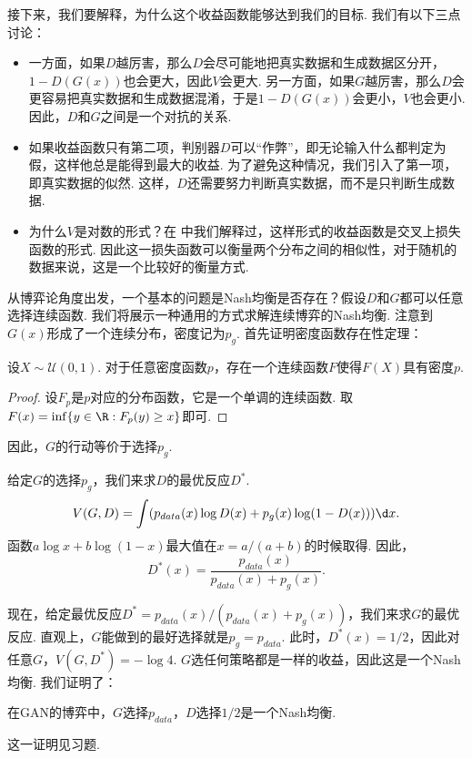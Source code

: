 接下来，我们要解释，为什么这个收益函数能够达到我们的目标. 我们有以下三点讨论：

\begin{itemize}
    \item 一方面，如果$D$越厉害，那么$D$会尽可能地把真实数据和生成数据区分开，$1-D(G(x))$也会更大，因此$V$会更大. 另一方面，如果$G$越厉害，那么$D$会更容易把真实数据和生成数据混淆，于是$1-D(G(x))$会更小，$V$也会更小. 因此，$D$和$G$之间是一个对抗的关系.
    
    \item 如果收益函数只有第二项，判别器$D$可以“作弊”，即无论输入什么都判定为假，这样他总是能得到最大的收益. 为了避免这种情况，我们引入了第一项，即真实数据的似然. 这样，$D$还需要努力判断真实数据，而不是只判断生成数据.
    
    \item 为什么$V$是对数的形式？在 中我们解释过，这样形式的收益函数是交叉上损失函数的形式. 因此这一损失函数可以衡量两个分布之间的相似性，对于随机的数据来说，这是一个比较好的衡量方式.
\end{itemize}


从博弈论角度出发，一个基本的问题是Nash均衡是否存在？假设$D$和$G$都可以任意选择连续函数. 我们将展示一种通用的方式求解连续博弈的Nash均衡. 注意到$G(x)$形成了一个连续分布，密度记为$p_g$.  首先证明密度函数存在性定理：
\begin{theorem}
设$X\sim \mathcal U(0,1)$. 对于任意密度函数$p$，存在一个连续函数$F$使得$F(X)$具有密度$p$.
\end{theorem}
\begin{proof}
设$F_p$是$p$对应的分布函数，它是一个单调的连续函数. 取$F(x)=\inf\{y\in \R: F_p(y)\geq x\}$即可.
\end{proof}
因此，$G$的行动等价于选择$p_g$.

给定$G$的选择$p_g$，我们来求$D$的最优反应$D^*$.
    \[V(G,D)=\int (p_{data}(x)\log D(x)+p_g(x)\log(1-D(x)))\d x.\]
函数$a\log x+b\log(1-x)$最大值在$x=a/(a+b)$的时候取得. 因此，
    \[D^*(x)=\frac{p_{data}(x)}{p_{data}(x)+p_g(x)}.\]
    
现在，给定最优反应$D^*=p_{data}(x)/(p_{data}(x)+p_g(x))$，我们来求$G$的最优反应. 直观上，$G$能做到的最好选择就是$p_g=p_{data}$. 此时，$D^*(x)=1/2$，因此对任意$G$，$V(G,D^*)=-\log 4$. $G$选任何策略都是一样的收益，因此这是一个Nash均衡. 我们证明了：
\begin{theorem}[GAN的Nash均衡存在性]
在GAN的博弈中，$G$选择$p_{data}$，$D$选择$1/2$是一个Nash均衡.
\end{theorem}
这一证明见习题.

